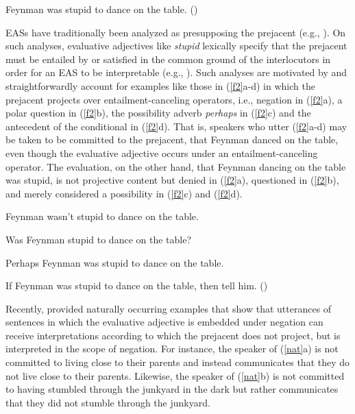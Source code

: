 \documentclass[11pt,fleqn]{article}
\newcommand{\6}{\mbox{$[\hspace*{-.6mm}[$}}
\newcommand{\9}{\mbox{$]\hspace*{-.6mm}]$}}
\begin{document}
\begin{exe} \ex\label{f} Feynman was stupid to dance on the table. \hfill (\citealt[18]{barker02})

\end{exe} 

EASs have traditionally been analyzed as presupposing the prejacent (e.g., \citealt{norrick78,barker02,oshima09b,kertz2010}). On such analyses,  evaluative adjectives like {\em stupid} lexically specify that the prejacent
must be entailed by or satisfied in the common ground of the interlocutors in
order for an EAS to be interpretable (e.g.,
\citealt{heim83,vds92}). Such analyses are motivated by and straightforwardly account for examples like those in (\ref{f2}a-d) in which the prejacent projects over entailment-canceling operators, i.e., negation in (\ref{f2}a), a polar question in (\ref{f2}b), the possibility adverb {\em perhaps} in (\ref{f2}c) and the antecedent of the conditional in (\ref{f2}d). That is, speakers who utter (\ref{f2}a-d) may be taken to be committed to the prejacent, that Feynman danced on the table, even though the evaluative adjective occurs under an entailment-canceling operator. The evaluation, on the other hand, that Feynman dancing on the table was stupid, is not projective content but denied in (\ref{f2}a), questioned in (\ref{f2}b), and merely considered a possibility in (\ref{f2}c) and (\ref{f2}d).

\begin{exe}

\ex\label{f2} 

\begin{xlist}

\ex Feynman wasn't stupid to dance on the table.

\ex Was Feynman stupid to dance on the table?

\ex Perhaps Feynman was stupid to dance on the table.

\ex If Feynman was stupid to dance on the table, then tell him. \hfill (\citealt[18f.]{barker02})

\end{xlist}
\end{exe}

Recently, \citet{karttunen-etal2014} provided naturally occurring examples that show that utterances of sentences in which the evaluative adjective is embedded under negation can receive interpretations according to which the prejacent
does not project, but is interpreted in the scope of negation. For instance, the speaker of (\ref{nat}a) is not committed to living close to their parents and instead communicates that they do not live close to their parents. Likewise, the speaker of (\ref{nat}b) is not committed to having stumbled through the junkyard in the dark but rather communicates that they did not stumble through the junkyard.
\end{document}
